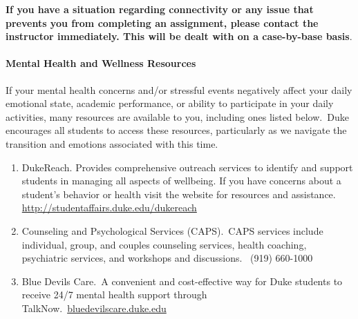 \documentclass[11pt]{article}
\begin{document}
\textbf{If you have a situation regarding connectivity or any issue that prevents you from completing an assignment, please contact the instructor immediately. This will be dealt with on a case-by-base basis}. \\




\paragraph{Mental Health and Wellness Resources}

If your mental health concerns and/or stressful events negatively affect your daily emotional state, academic performance, or ability to participate in your daily activities, many resources are available to you, including ones listed below. Duke encourages all students to access these resources, particularly as we navigate the transition and emotions associated with this time. 


\begin{enumerate}
\item DukeReach. Provides comprehensive outreach services to identify and support students in managing all aspects of wellbeing. If you have concerns about a student's behavior or health visit the website for resources and assistance. \url{http://studentaffairs.duke.edu/dukereach}
\item Counseling and Psychological Services (CAPS). CAPS services include individual, group, and couples counseling services, health coaching, psychiatric services, and workshops and discussions.  (919) 660-1000
\item Blue Devils Care. A convenient and cost-effective way for Duke students to receive 24/7 mental health support through TalkNow. \url{bluedevilscare.duke.edu}
\end{enumerate}
\end{document}
